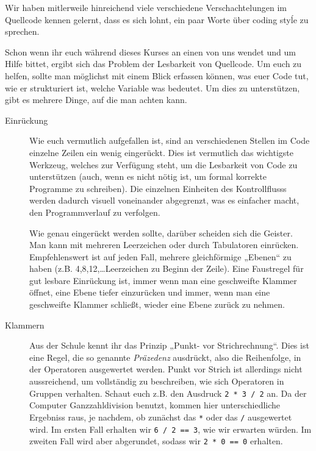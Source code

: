 
Wir haben mitlerweile hinreichend viele verschiedene Verschachtelungen im
Quellcode kennen gelernt, dass es sich lohnt, ein paar Worte über coding styĺe
zu sprechen.

Schon wenn ihr euch während dieses Kurses an einen von uns wendet und um Hilfe
bittet, ergibt sich das Problem der Lesbarkeit von Quellcode. Um euch zu
helfen, sollte man möglichst mit einem Blick erfassen können, was euer Code
tut, wie er strukturiert ist, welche Variable was bedeutet. Um dies zu
unterstützen, gibt es mehrere Dinge, auf die man achten kann.

\begin{description}
    \item[Einrückung]
        Wie euch vermutlich aufgefallen ist, sind an verschiedenen Stellen im
        Code einzelne Zeilen ein wenig eingerückt. Dies ist vermutlich das
        wichtigste Werkzeug, welches zur Verfügung steht, um die Lesbarkeit von
        Code zu unterstützen (auch, wenn es nicht nötig ist, um formal korrekte
        Programme zu schreiben). Die einzelnen Einheiten des Kontrollflusss
        werden dadurch visuell voneinander abgegrenzt, was es einfacher macht,
        den Programmverlauf zu verfolgen.

        Wie genau eingerückt werden sollte, darüber scheiden sich die Geister.
        Man kann mit mehreren Leerzeichen oder durch Tabulatoren einrücken.
        Empfehlenswert ist auf jeden Fall, mehrere gleichförmige „Ebenen“ zu
        haben (z.B. 4,8,12,\dots Leerzeichen zu Beginn der Zeile). Eine
        Faustregel für gut lesbare Einrückung ist, immer wenn man eine
        geschweifte Klammer öffnet, eine Ebene tiefer einzurücken und immer,
        wenn man eine geschweifte Klammer schließt, wieder eine Ebene zurück zu
        nehmen.
    \item[Klammern]
        Aus der Schule kennt ihr das Prinzip „Punkt- vor Strichrechnung“. Dies
        ist eine Regel, die so genannte \emph{Präzedenz} ausdrückt, also die
        Reihenfolge, in der Operatoren ausgewertet werden. Punkt vor Strich ist
        allerdings nicht aussreichend, um vollständig zu beschreiben, wie sich
        Operatoren in Gruppen verhalten. Schaut euch z.B. den Ausdruck
        \texttt{2 * 3 / 2} an. Da der Computer Ganzzahldivision benutzt, kommen
        hier unterschiedliche Ergebniss raus, je nachdem, ob zunächst das
        \texttt{*} oder das \texttt{/} ausgewertet wird. Im ersten Fall
        erhalten wir \texttt{6 / 2 == 3}, wie wir erwarten würden. Im zweiten
        Fall wird aber abgerundet, sodass wir \texttt{2 * 0 == 0} erhalten.


\end{description}
